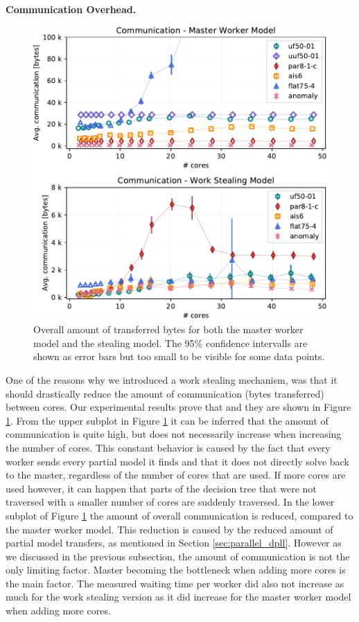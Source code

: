 \documentclass[letterpaper]{article}
\newcommand{\mypar}[1]{{\bf #1.}}
\begin{document}
\mypar{Communication Overhead}
\begin{figure}[p]
    \centering
    \includegraphics[width=\columnwidth]{figures/comm_subset_dpll_scaling_tar.pdf}
    \caption{Overall amount of transferred bytes for both the master worker model and the stealing model.
    The 95\% confidence intervalls are shown as error bars but too small to be visible for some data points.}
    \label{fig:comm_reduce}
\end{figure}
One of the reasons why we introduced a work stealing mechanism,
was that it should drastically reduce the amount of communication (bytes transferred) between cores.
Our experimental results prove that and they are shown in Figure \ref{fig:comm_reduce}.
From the upper subplot in Figure \ref{fig:comm_reduce} it can be inferred that the amount of communication is quite high,
but does not necessarily increase when increasing the number of cores.
This constant behavior is caused by the fact that every worker sends every partial model it finds and that it does not directly solve back to the master,
regardless of the number of cores that are used.
If more cores are used however, it can happen that parts of the decision tree that were not traversed with a smaller number of cores are suddenly traversed.
In the lower subplot of Figure \ref{fig:comm_reduce} the amount of overall communication is reduced, compared to the master worker model.
This reduction is caused by the reduced amount of partial model transfers, as mentioned in Section \ref{sec:parallel_dpll}.
However as we discussed in the previous subsection, the amount of communication is not the only limiting factor.
Master becoming the bottleneck when adding more cores is the main factor.
The measured waiting time per worker did also not increase as much for the work stealing version as it did increase for the master worker model when adding more cores.
\end{document}
